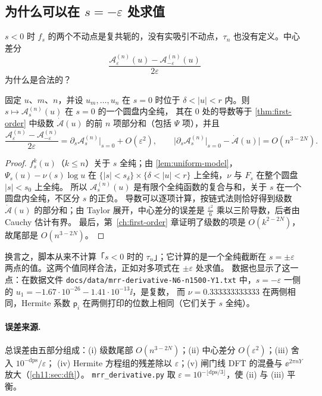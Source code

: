 \subsection{为什么可以在 \texorpdfstring{$s=-\varepsilon$}{s=-eps} 处求值}\label{ch11:sec:both-signs}
$s<0$ 时 $f_s$ 的两个不动点是复共轭的，没有实吸引不动点，$\tau_n$ 也没有定义。中心差分
\[
 \frac{\mathcal A^{(n)}_{\varepsilon}(u)-\mathcal A^{(n)}_{-\varepsilon}(u)}{2\varepsilon}
\]
为什么是合法的？

\begin{proposition}\label{ch11:prop:both-signs}
固定 $u$、$m$、$n$，并设 $u_m,\dots,u_n$ 在 $s=0$ 时位于 $\delta<|u|<r$ 内。则 $s\mapsto\mathcal A^{(n)}_s(u)$ 在 $s=0$ 的一个圆盘内全纯，
其在 $0$ 处的导数等于 \cref{thm:first-order} 中级数 $\dot{\mathcal A}(u)$ 的前 $n$ 项部分和（包括 $\Psi$ 项），并且
\[
 \frac{\mathcal A^{(n)}_{\varepsilon}-\mathcal A^{(n)}_{-\varepsilon}}{2\varepsilon}=\partial_s\mathcal A^{(n)}_s\big|_{s=0}+O(\varepsilon^2),\qquad
 \bigl|\partial_s\mathcal A^{(n)}_s|_{s=0}-\dot{\mathcal A}(u)\bigr|=O(n^{3-2N}) .
\]
\end{proposition}

\begin{proof}
$f_s^k(u)$（$k\le n$）关于 $s$ 全纯；由 \cref{lem:uniform-model}，$\Psi_s(u)-\nu(s)\log u$ 在 $\{|s|<s_\delta\}\times\{\delta<|u|<r\}$ 上全纯，$\nu$ 与 $F_s$ 在整个圆盘 $|s|<s_0$ 上全纯。
所以 $\mathcal A^{(n)}_s(u)$ 是有限个全纯函数的复合与和，关于 $s$ 在一个圆盘内全纯，不区分 $s$ 的正负。
导数可以逐项计算，按链式法则恰好得到级数 $\dot{\mathcal A}(u)$ 的部分和；由 Taylor 展开，中心差分的误差是 $\tfrac{\varepsilon^2}6$ 乘以三阶导数，后者由 Cauchy 估计有界。
最后，第~\ref{ch:first-order} 章证明了级数的项是 $O(k^{2-2N})$，故尾部是 $O(n^{3-2N})$。
\end{proof}

换言之，脚本从来不计算「$s<0$ 时的 $\tau_n$」；它计算的是一个全纯截断在 $s=\pm\varepsilon$ 两点的值。这两个值同样合法，正如对多项式在 $\pm\varepsilon$ 处求值。
数据也显示了这一点：在数据文件 \texttt{docs/\allowbreak data/\allowbreak mrr-\allowbreak derivative-\allowbreak N6-\allowbreak n1500-\allowbreak Y1.txt} 中，$s=-\varepsilon$ 一侧的 $u_1=-1.67\cdot10^{-26}-1.41\cdot10^{-13}\ii$，是复数，
而 $\nu=0.333333333333$ 在两侧相同，Hermite 系数 $\mathsf p_i$ 在两侧打印的位数上相同（它们关于 $s$ 全纯）。

\paragraph{误差来源.} 总误差由五部分组成：(i) 级数尾部 $O(n^{3-2N})$；(ii) 中心差分 $O(\varepsilon^2)$；(iii) 舍入 $10^{-\mathrm{dps}}/\varepsilon$；
(iv) Hermite 方程组的残差除以 $\varepsilon$；(v) 闸门线 DFT 的混叠与 $\ee^{2\pi nY}$ 放大（\cref{ch11:sec:dft}）。
\texttt{mrr\_\allowbreak{}derivative.py} 取 $\varepsilon=10^{-\lfloor\mathrm{dps}/3\rfloor}$，使 (ii) 与 (iii) 平衡。

